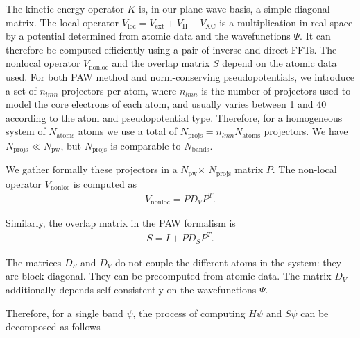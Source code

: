 \documentclass[11pt]{elsarticle}
\newcommand{\npw}{\ensuremath{N_{\text{pw}}}\xspace}
\newcommand{\nprojs}{\ensuremath{N_{\text{projs}}}\xspace}
\newcommand{\nband}{\ensuremath{N_{\text{bands}}}\xspace}
\newcommand{\natom}{\ensuremath{N_{\text{atoms}}}\xspace}
\newcommand{\nlmn}{\ensuremath{n_{lmn}}\xspace}
\begin{document}
The kinetic energy operator $K$ is, in our plane wave basis, a simple
diagonal matrix. The local operator $V_{\text{loc}} = V_{\text{ext}} +
V_{\text{H}} + V_{\text{XC}}$ is a multiplication in real space by a
potential determined from atomic data and the wavefunctions $\Psi$. It can therefore
be computed efficiently using a pair of inverse and direct FFTs. The
nonlocal operator $V_{\text{nonloc}}$ and the overlap matrix $S$
depend on the atomic data used. For both PAW method and
norm-conserving pseudopotentials, we introduce a set of
$\nlmn$ projectors per atom, where $\nlmn$ is the
number of projectors used to model the core electrons of each atom,
and usually varies between 1 and 40 according to the atom and
pseudopotential type. Therefore, for a homogeneous system of $\natom$
atoms we use a total of $\nprojs = \nlmn \natom$
projectors. We have $\nprojs \ll \npw$, but \nprojs is comparable to
\nband.

We gather formally these projectors in a \npw$ \times$ \nprojs matrix
$P$. The non-local operator $V_{\text{nonloc}}$ is computed as
\begin{align}
  V_{\text{nonloc}} = P D_{V} P^{T}.
\end{align}

Similarly, the overlap matrix in the PAW formalism is
\begin{align}
  S = I + P D_{S} P^{T}.
\end{align}

The matrices $D_{S}$ and $D_{V}$ do not couple the different atoms in
the system: they are block-diagonal. They can be precomputed from
atomic data. The matrix $D_{V}$ additionally depends self-consistently
on the wavefunctions $\Psi$.

Therefore, for a single band $\psi$, the process of computing
$H \psi$ and $S \psi$ can be decomposed as follows
\end{document}
